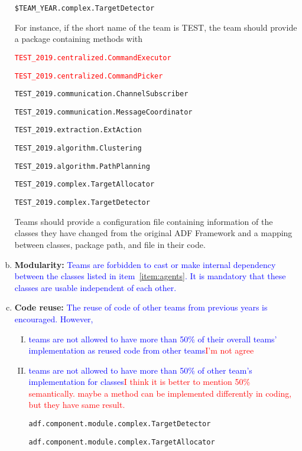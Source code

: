 \documentclass{article}
\begin{document}
\begin{enumerate}[(a)]
\texttt{\$TEAM\_YEAR.complex.TargetDetector}

\normalsize
For instance, if the short name of the team is TEST, the team should provide a package containing methods with

\small

\texttt{\textcolor{red}{TEST\_2019.centralized.CommandExecutor}}

\texttt{\textcolor{red}{TEST\_2019.centralized.CommandPicker}}

\texttt{TEST\_2019.communication.ChannelSubscriber}

\texttt{TEST\_2019.communication.MessageCoordinator}

\texttt{TEST\_2019.extraction.ExtAction}

\texttt{TEST\_2019.algorithm.Clustering}

\texttt{TEST\_2019.algorithm.PathPlanning}

\texttt{TEST\_2019.complex.TargetAllocator}

\texttt{TEST\_2019.complex.TargetDetector}

\normalsize


Teams should provide a configuration file containing information of the classes they have changed from the original ADF Framework and a mapping between classes, package path, and file in their code. \label{item:agents}
\item \textbf{Modularity:} \textcolor{blue}{Teams are forbidden to cast or make internal dependency between the classes listed in item~\ref{item:agents}. It is mandatory that these classes are usable independent of each other.}
\item \textbf{Code reuse:} \textcolor{blue}{The reuse of code of other teams from previous years is encouraged. However,}

\begin{enumerate}[I.]
  \item \textcolor{blue}{teams are not allowed to have more than 50\% of their overall teams' implementation as reused code from other teams}\textcolor{red}{I'm not agree}
  \item \textcolor{blue}{teams are not allowed to have more than 50\% of other team's implementation for classes}\textcolor{red}{I think it is better to mention 50\% semantically. maybe a method can be implemented differently in coding, but they have same result.}

    \small
    \texttt{adf.component.module.complex.TargetDetector}

    \texttt{adf.component.module.complex.TargetAllocator}


\end{enumerate}
\end{enumerate}
\end{document}
